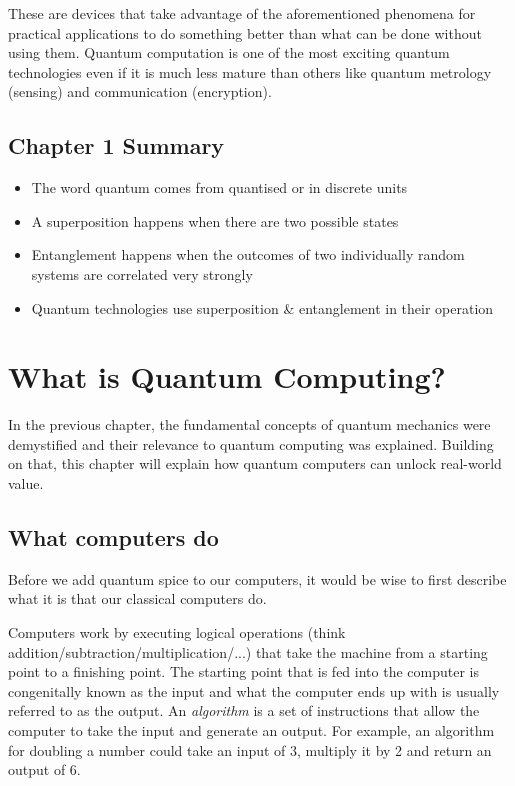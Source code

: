 \documentclass{book}
\begin{document}
These are devices that take advantage of the aforementioned phenomena for practical applications to do something better than what can be done without using them. Quantum computation is one of the most exciting quantum technologies even if it is much less mature than others like quantum metrology (sensing) and communication (encryption).


\section{Chapter 1 Summary} 

\begin{itemize}

    \item The word quantum comes from quantised or in discrete units 
    \item A superposition happens when there are two possible states
    \item Entanglement happens when the outcomes of two individually random systems are correlated very strongly 
    \item Quantum technologies use superposition \& entanglement in their operation 
    
\end{itemize}

\chapter{What is Quantum Computing?}


In the previous chapter, the fundamental concepts of quantum mechanics were demystified and their relevance to quantum computing was explained. Building on that, this chapter will explain how quantum computers can unlock real-world value.

\section{What computers do}

Before we add quantum spice to our computers, it would be wise to first describe what it is that our classical computers do. 

Computers work by executing logical operations (think addition/subtraction/multiplication/...) that take the machine from a starting point to a finishing point. The starting point that is fed into the computer is congenitally known as the input and what the computer ends up with is usually referred to as the output. An \textit{algorithm} is a set of instructions that allow the computer to take the input and generate an output. For example, an algorithm for doubling a number could take an input of 3, multiply it by 2 and return an output of 6. 
\end{document}
